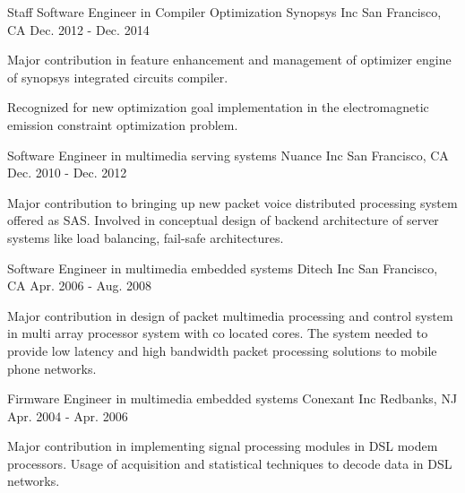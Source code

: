 \begin{cventries}
  \cventry
    {Staff Software Engineer in Compiler Optimization } %
    {Synopsys Inc} %
    {San Francisco, CA} %
    {Dec. 2012 - Dec. 2014} %
    {
      \begin{cvitems} %
        \item {Major contribution in feature enhancement and management of optimizer engine of synopsys integrated circuits compiler.}
        \item {Recognized for new optimization goal implementation in the electromagnetic emission constraint optimization problem.}
      \end{cvitems}
    }
  \cventry
    {Software Engineer in multimedia serving  systems } %
    {Nuance Inc} %
    {San Francisco, CA} %
    {Dec. 2010 - Dec. 2012} %
    {
      \begin{cvitems} %
        \item {Major contribution to bringing up new packet voice distributed processing system offered as SAS. Involved in conceptual design of backend architecture of server systems like load balancing, fail-safe architectures.}
      \end{cvitems}
    }

  \cventry
    {Software Engineer in multimedia embedded  systems } %
    {Ditech Inc} %
    {San Francisco, CA} %
    {Apr. 2006 - Aug. 2008} %
    {
      \begin{cvitems} %
       \item {Major contribution in design of packet multimedia processing and control system in multi array processor system with co located cores. The system needed to provide low latency and high bandwidth packet processing solutions to mobile phone networks.}
      \end{cvitems}
    }
  \cventry
    {Firmware Engineer in multimedia embedded  systems } %
    {Conexant Inc} %
    {Redbanks, NJ} %
    {Apr. 2004 - Apr. 2006} %
    {
      \begin{cvitems} %
       \item {Major contribution in implementing signal processing modules in DSL modem processors. Usage of acquisition and statistical techniques to decode data in DSL networks.}
      \end{cvitems}
    }


\end{cventries}
